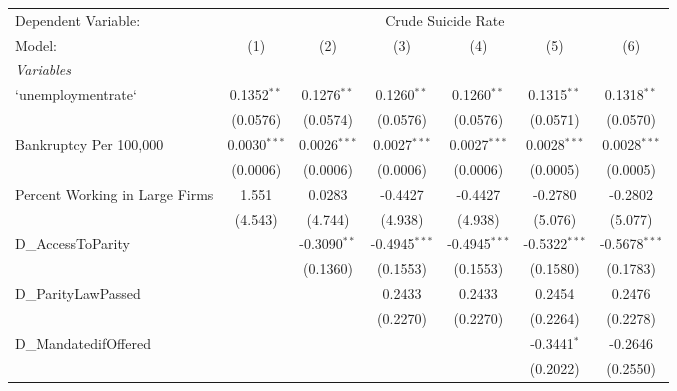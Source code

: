 \begingroup
\centering
\begin{tabular}{lcccccc}
   \tabularnewline \midrule \midrule
   Dependent Variable: & \multicolumn{6}{c}{Crude Suicide Rate}\\
   Model:                         & (1)            & (2)            & (3)             & (4)             & (5)             & (6)\\  
   \midrule
   \emph{Variables}\\
   `unemploymentrate`             & 0.1352$^{**}$  & 0.1276$^{**}$  & 0.1260$^{**}$   & 0.1260$^{**}$   & 0.1315$^{**}$   & 0.1318$^{**}$\\   
                                  & (0.0576)       & (0.0574)       & (0.0576)        & (0.0576)        & (0.0571)        & (0.0570)\\   
   Bankruptcy Per 100,000         & 0.0030$^{***}$ & 0.0026$^{***}$ & 0.0027$^{***}$  & 0.0027$^{***}$  & 0.0028$^{***}$  & 0.0028$^{***}$\\   
                                  & (0.0006)       & (0.0006)       & (0.0006)        & (0.0006)        & (0.0005)        & (0.0005)\\   
   Percent Working in Large Firms & 1.551          & 0.0283         & -0.4427         & -0.4427         & -0.2780         & -0.2802\\   
                                  & (4.543)        & (4.744)        & (4.938)         & (4.938)         & (5.076)         & (5.077)\\   
   D\_AccessToParity              &                & -0.3090$^{**}$ & -0.4945$^{***}$ & -0.4945$^{***}$ & -0.5322$^{***}$ & -0.5678$^{***}$\\   
                                  &                & (0.1360)       & (0.1553)        & (0.1553)        & (0.1580)        & (0.1783)\\   
   D\_ParityLawPassed             &                &                & 0.2433          & 0.2433          & 0.2454          & 0.2476\\   
                                  &                &                & (0.2270)        & (0.2270)        & (0.2264)        & (0.2278)\\   
   D\_MandatedifOffered           &                &                &                 &                 & -0.3441$^{*}$   & -0.2646\\   
                                  &                &                &                 &                 & (0.2022)        & (0.2550)\\   

\end{tabular}
